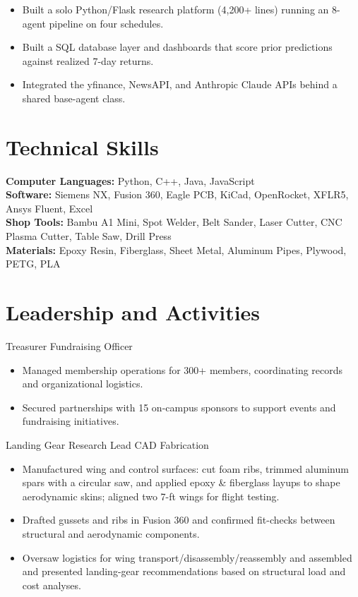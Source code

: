 \begin{itemize}
  \item Built a solo Python/Flask research platform (4,200+ lines) running an 8-agent pipeline on four schedules.
  \item Built a SQL database layer and dashboards that score prior predictions against realized 7-day returns.
  \item Integrated the yfinance, NewsAPI, and Anthropic Claude APIs behind a shared base-agent class.
\end{itemize}

\section{Technical Skills}
\textbf{Computer Languages:} Python, C++, Java, JavaScript\\
\textbf{Software:} Siemens NX, Fusion 360, Eagle PCB, KiCad, OpenRocket, XFLR5, Ansys Fluent, Excel\\
\textbf{Shop Tools:} Bambu A1 Mini, Spot Welder, Belt Sander, Laser Cutter, CNC Plasma Cutter, Table Saw, Drill Press\\
\textbf{Materials:} Epoxy Resin, Fiberglass, Sheet Metal, Aluminum Pipes, Plywood, PETG, PLA

\section{Leadership and Activities}

Treasurer \textbar{} Fundraising Officer
\begin{itemize}
  \item Managed membership operations for 300+ members, coordinating records and organizational logistics.
  \item Secured partnerships with 15 on-campus sponsors to support events and fundraising initiatives.
\end{itemize}
\entrygap

Landing Gear Research Lead \textbar{} CAD \textbar{} Fabrication
\begin{itemize}
  \item Manufactured wing and control surfaces: cut foam ribs, trimmed aluminum spars with a circular saw, and applied epoxy \& fiberglass layups to shape aerodynamic skins; aligned two 7-ft wings for flight testing.
  \item Drafted gussets and ribs in Fusion 360 and confirmed fit-checks between structural and aerodynamic components.
  \item Oversaw logistics for wing transport/disassembly/reassembly and assembled and presented landing-gear recommendations based on structural load and cost analyses.
\end{itemize}


